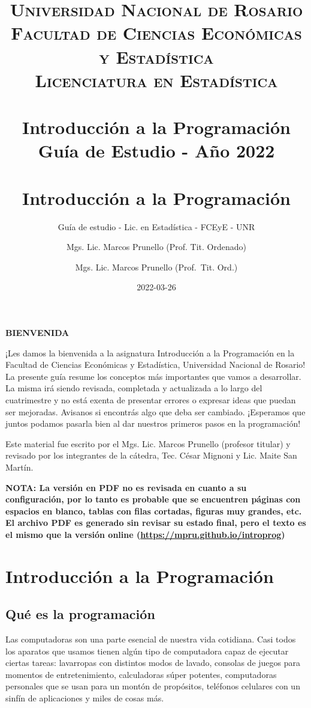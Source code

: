 \documentclass[
]{book}
\title{
	\usefont{OT1}{bch}{b}{n}
	\normalfont \normalsize
	\textsc{
		Universidad Nacional de Rosario \\
		Facultad de Ciencias Económicas y Estadística \\
		Licenciatura en Estadística
	} \\ [25pt]
	\horrule{2pt} \\[0.4cm]
	\huge \textbf{Introducción a la Programación} \\
	\bigbreak
	Guía de Estudio - Año 2022\\
	\horrule{2pt} \\[0.5cm]}
\author{
	\normalfont Mgs. Lic. Marcos Prunello (Prof. Tit. Ordenado)
}
\title{Introducción a la Programación}
\subtitle{Guía de estudio - Lic. en Estadística - FCEyE - UNR}
\author{Mgs. Lic. Marcos Prunello (Prof.~Tit. Ord.)}
\date{2022-03-26}
\begin{document}
\maketitle

{
\setcounter{tocdepth}{1}
\tableofcontents
}
\newpage

\textbf{BIENVENIDA}

\vspace{\baselineskip}

¡Les damos la bienvenida a la asignatura Introducción a la Programación en la Facultad de Ciencias Económicas y Estadística, Universidad Nacional de Rosario! La presente guía resume los conceptos más importantes que vamos a desarrollar. La misma irá siendo revisada, completada y actualizada a lo largo del cuatrimestre y no está exenta de presentar errores o expresar ideas que puedan ser mejoradas. Avisanos si encontrás algo que deba ser cambiado. ¡Esperamos que juntos podamos pasarla bien al dar nuestros primeros pasos en la programación!

\vspace{\baselineskip}

Este material fue escrito por el Mgs. Lic. Marcos Prunello (profesor titular) y revisado por los integrantes de la cátedra, Tec. César Mignoni y Lic. Maite San Martín.

\vspace{\baselineskip}

\textbf{NOTA: La versión en PDF no es revisada en cuanto a su configuración, por lo tanto es probable que se encuentren páginas con espacios en blanco, tablas con filas cortadas, figuras muy grandes, etc. El archivo PDF es generado sin revisar su estado final, pero el texto es el mismo que la versión online (\url{https://mpru.github.io/introprog})}

\hypertarget{introducciuxf3n-a-la-programaciuxf3n}{%
\chapter{Introducción a la Programación}\label{introducciuxf3n-a-la-programaciuxf3n}}

\hypertarget{quuxe9-es-la-programaciuxf3n}{%
\section{Qué es la programación}\label{quuxe9-es-la-programaciuxf3n}}

Las computadoras son una parte esencial de nuestra vida cotidiana. Casi todos los aparatos que usamos tienen algún tipo de computadora capaz de ejecutar ciertas tareas: lavarropas con distintos modos de lavado, consolas de juegos para momentos de entretenimiento, calculadoras súper potentes, computadoras personales que se usan para un montón de propósitos, teléfonos celulares con un sinfín de aplicaciones y miles de cosas más.
\end{document}
